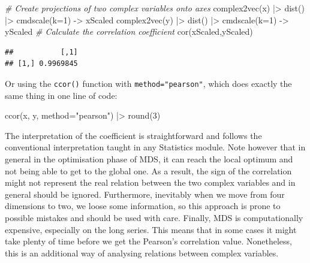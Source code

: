 \documentclass[
]{book}
\newenvironment{Shaded}{\begin{snugshade}}{\end{snugshade}}
\newcommand{\AttributeTok}[1]{\textcolor[rgb]{0.77,0.63,0.00}{#1}}
\newcommand{\CommentTok}[1]{\textcolor[rgb]{0.56,0.35,0.01}{\textit{#1}}}
\newcommand{\DecValTok}[1]{\textcolor[rgb]{0.00,0.00,0.81}{#1}}
\newcommand{\FunctionTok}[1]{\textcolor[rgb]{0.00,0.00,0.00}{#1}}
\newcommand{\NormalTok}[1]{#1}
\newcommand{\OtherTok}[1]{\textcolor[rgb]{0.56,0.35,0.01}{#1}}
\newcommand{\SpecialCharTok}[1]{\textcolor[rgb]{0.00,0.00,0.00}{#1}}
\newcommand{\StringTok}[1]{\textcolor[rgb]{0.31,0.60,0.02}{#1}}
\begin{document}
\begin{Shaded}
\begin{Highlighting}[]
\CommentTok{\# Create projections of two complex variables onto axes}
\FunctionTok{complex2vec}\NormalTok{(x) }\SpecialCharTok{|\textgreater{}} \FunctionTok{dist}\NormalTok{() }\SpecialCharTok{|\textgreater{}} \FunctionTok{cmdscale}\NormalTok{(}\AttributeTok{k=}\DecValTok{1}\NormalTok{) }\OtherTok{{-}\textgreater{}}\NormalTok{ xScaled}
\FunctionTok{complex2vec}\NormalTok{(y) }\SpecialCharTok{|\textgreater{}} \FunctionTok{dist}\NormalTok{() }\SpecialCharTok{|\textgreater{}} \FunctionTok{cmdscale}\NormalTok{(}\AttributeTok{k=}\DecValTok{1}\NormalTok{) }\OtherTok{{-}\textgreater{}}\NormalTok{ yScaled}
\CommentTok{\# Calculate the correlation coefficient}
\FunctionTok{cor}\NormalTok{(xScaled,yScaled)}
\end{Highlighting}
\end{Shaded}

\begin{verbatim}
##           [,1]
## [1,] 0.9969845
\end{verbatim}

Or using the \texttt{ccor()} function with \texttt{method="pearson"}, which does exactly the same thing in one line of code:

\begin{Shaded}
\begin{Highlighting}[]
\FunctionTok{ccor}\NormalTok{(x, y, }\AttributeTok{method=}\StringTok{"pearson"}\NormalTok{) }\SpecialCharTok{|\textgreater{}} \FunctionTok{round}\NormalTok{(}\DecValTok{3}\NormalTok{)}
\end{Highlighting}
\end{Shaded}

The interpretation of the coefficient is straightforward and follows the conventional interpretation taught in any Statistics module. Note however that in general in the optimisation phase of MDS, it can reach the local optimum and not being able to get to the global one. As a result, the sign of the correlation might not represent the real relation between the two complex variables and in general should be ignored. Furthermore, inevitably when we move from four dimensions to two, we loose some information, so this approach is prone to possible mistakes and should be used with care. Finally, MDS is computationally expensive, especially on the long series. This means that in some cases it might take plenty of time before we get the Pearson's correlation value. Nonetheless, this is an additional way of analysing relations between complex variables.
\end{document}
